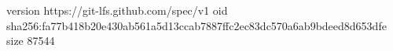 version https://git-lfs.github.com/spec/v1
oid sha256:fa77b418b20e430ab561a5d13ccab7887ffc2ec83dc570a6ab9bdeed8d653dfe
size 87544
